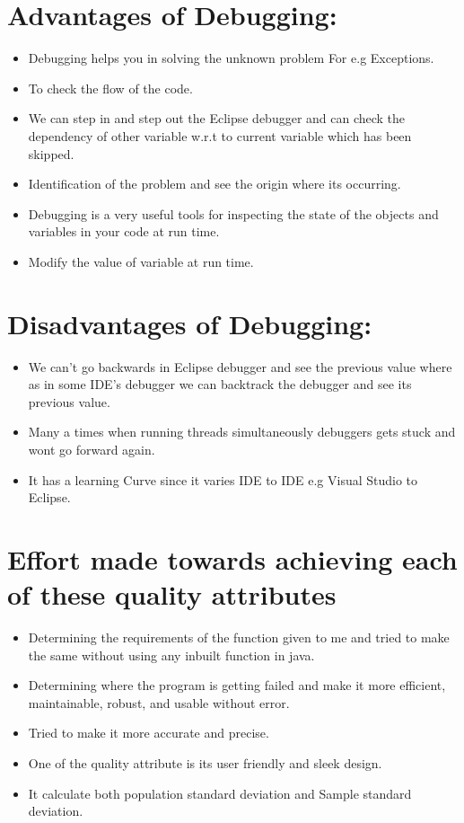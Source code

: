 \documentclass{article}
\begin{document}
\section{Advantages of Debugging:}
\begin{itemize}
  \item  Debugging helps you in solving the unknown problem For e.g Exceptions.
  \item  To check the flow of the code.
  \item  We can step in and step out the Eclipse debugger and can check the dependency of other variable w.r.t to current variable which has been skipped.
  \item Identification of the problem and see the origin where its occurring.
  \item Debugging is a very useful tools for inspecting the state of the objects and variables in your code at run time.
  \item Modify the value of variable at run time.
\end{itemize}

\section{Disadvantages of Debugging:}
\begin{itemize}
  \item We can't go backwards in Eclipse debugger and see the previous value where as in some IDE's debugger we can backtrack the debugger and see its previous value.
  \item  Many a times when running threads simultaneously debuggers gets stuck and wont go forward again.
  \item It has a learning Curve since it varies IDE to IDE e.g Visual Studio to Eclipse.
\end{itemize}

\section{Effort made towards achieving each of these quality attributes}
\begin{itemize}
  \item Determining  the requirements of the function given to me and  tried to make the same without using any inbuilt function in java.
  \item Determining where the program is getting  failed and make it more efficient, maintainable, robust, and usable without error.
  \item Tried to make it more accurate and precise. 
  \item One of the quality attribute is its user friendly and sleek design.
  \item It calculate both population standard deviation and Sample standard deviation.
\end{itemize}
\end{document}
